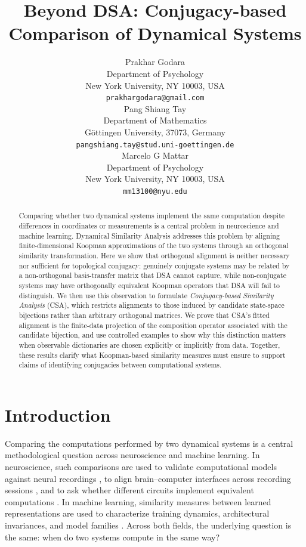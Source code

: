 \documentclass{article}
\title{Beyond DSA: Conjugacy-based Comparison of Dynamical Systems}
\author{%
  Prakhar Godara \\
  Department of Psychology\\
  New York University, NY 10003, USA \\
  \texttt{prakhargodara@gmail.com} \\
   \And
   Pang Shiang Tay \\
  Department of Mathematics\\
  G\"ottingen University, 37073, Germany \\
  \texttt{pangshiang.tay@stud.uni-goettingen.de} \\
   \And
   Marcelo G Mattar \\
  Department of Psychology\\
  New York University, NY 10003, USA \\
  \texttt{mm13100@nyu.edu} 
}
\theoremstyle{definition}
\begin{document}
\maketitle


\begin{abstract}
Comparing whether two dynamical systems implement the same computation despite differences in coordinates or measurements is a central problem in neuroscience and machine learning. Dynamical Similarity Analysis \citep[DSA;][]{ostrow2023beyond} addresses this problem by aligning finite-dimensional Koopman approximations of the two systems through an orthogonal similarity transformation. Here we show that orthogonal alignment is neither necessary nor sufficient for topological conjugacy: genuinely conjugate systems may be related by a non-orthogonal basis-transfer matrix that DSA cannot capture, while non-conjugate systems may have orthogonally equivalent Koopman operators that DSA will fail to distinguish. We then use this observation to formulate \emph{Conjugacy-based Similarity Analysis} (CSA), which restricts alignments to those induced by candidate state-space bijections rather than arbitrary orthogonal matrices. We prove that CSA's fitted alignment is the finite-data projection of the composition operator associated with the candidate bijection, and use controlled examples to show why this distinction matters when observable dictionaries are chosen explicitly or implicitly from data. Together, these results clarify what Koopman-based similarity measures must ensure to support claims of identifying conjugacies between computational systems.
\end{abstract}



\section{Introduction}
\label{sec:introduction}

Comparing the computations performed by two dynamical systems is a central methodological question across neuroscience and machine learning. In neuroscience, such comparisons are used to validate computational models against neural recordings \citep{schrimpf2020brain, pagan2022new}, to align brain--computer interfaces across recording sessions \citep{degenhart2020stabilization, karpowicz2025stabilizing}, and to ask whether different circuits implement equivalent computations \citep{chaudhuri2019intrinsic}. In machine learning, similarity measures between learned representations are used to characterize training dynamics, architectural invariances, and model families \citep{kriegeskorte2008representational, raghu2017svcca, williams2021generalized}. Across both fields, the underlying question is the same: when do two systems compute in the same way? 
\end{document}
